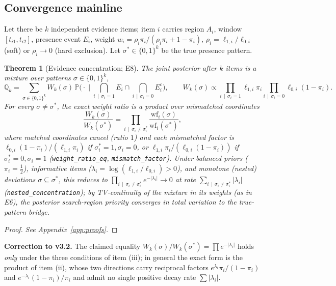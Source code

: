 \documentclass[11pt]{article}
\newtheorem{theorem}{Theorem}
\newcommand{\lean}[1]{\texttt{#1}}
\begin{document}
\subsection{Convergence mainline}
\label{sec:convergence}
Let there be $k$ independent evidence items; item $i$ carries region $A_i$, window
$[t_{i1},t_{i2}]$, presence event $E_i$, weight $w_i=\rho_i\pi_i/(\rho_i\pi_i+1-\pi_i)$,
$\rho_i=\ell_{1,i}/\ell_{0,i}$ (soft) or $\rho_i\to0$ (hard exclusion). Let
$\sigma^*\in\{0,1\}^k$ be the true presence pattern.

\begin{theorem}[Evidence concentration; E8]\label{thm:e8}
The joint posterior after $k$ items is a mixture over patterns $\sigma\in\{0,1\}^k$,
\begin{equation}
  \mathbb{Q}_k=\sum_{\sigma\in\{0,1\}^k}W_k(\sigma)\,
  \mathbb{P}\Big(\cdot\;\Big|\;\bigcap_{i\,\mid\,\sigma_i=1}E_i\cap\bigcap_{i\,\mid\,\sigma_i=0}E_i^{c}\Big),\qquad
  W_k(\sigma)\propto\prod_{i\,\mid\,\sigma_i=1}\ell_{1,i}\pi_i\prod_{i\,\mid\,\sigma_i=0}\ell_{0,i}(1-\pi_i).
\end{equation}
For every $\sigma\ne\sigma^*$, the exact weight ratio is a product over mismatched
coordinates
\begin{equation}
  \frac{W_k(\sigma)}{W_k(\sigma^*)}
  =\prod_{i\,\mid\,\sigma_i\ne\sigma^*_i}\frac{\mathrm{wf}_i(\sigma)}{\mathrm{wf}_i(\sigma^*)},
\end{equation}
where matched coordinates cancel (ratio $1$) and each mismatched factor is
$\ell_{0,i}(1-\pi_i)/(\ell_{1,i}\pi_i)$ if $\sigma^*_i=1,\sigma_i=0$, or
$\ell_{1,i}\pi_i/(\ell_{0,i}(1-\pi_i))$ if $\sigma^*_i=0,\sigma_i=1$
(\lean{weight\_ratio\_eq}, \lean{mismatch\_factor}). Under balanced priors
($\pi_i=\tfrac12$), informative items ($\lambda_i=\log(\ell_{1,i}/\ell_{0,i})>0$), and
monotone (nested) deviations $\sigma\subseteq\sigma^*$, this reduces to
$\prod_{i\,\mid\,\sigma_i\ne\sigma^*_i}e^{-|\lambda_i|}\to 0$ at rate
$\sum_{i\,\mid\,\sigma_i\ne\sigma^*_i}|\lambda_i|$ (\lean{nested\_concentration}); by TV-continuity
of the mixture in its weights (as in E6), the posterior search-region priority converges in
total variation to the true-pattern bridge.
\end{theorem}
\begin{proof}\emph{See Appendix~\ref{app:proofs}.}\end{proof}
\textbf{Correction to v3.2.} The claimed equality
$W_k(\sigma)/W_k(\sigma^*)=\prod e^{-|\lambda_i|}$ holds \emph{only} under the three
conditions of item (iii); in general the exact form is the product of item (ii), whose two
directions carry reciprocal factors $e^{\lambda_i}\pi_i/(1-\pi_i)$ and
$e^{-\lambda_i}(1-\pi_i)/\pi_i$ and admit no single positive decay rate $\sum|\lambda_i|$.
\end{document}
